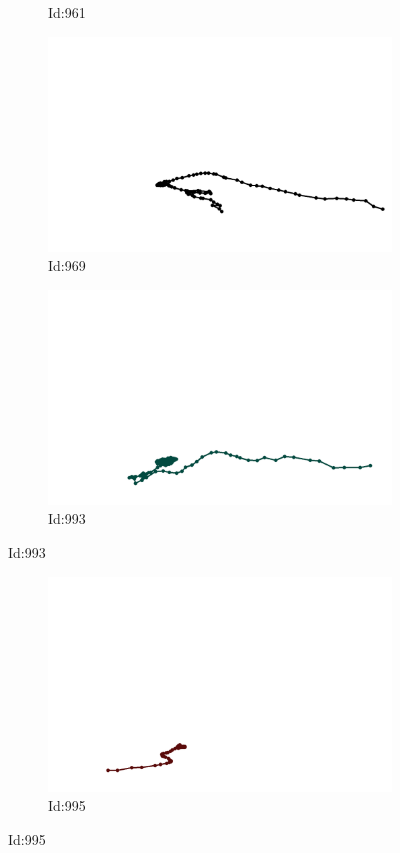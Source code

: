 \documentclass[12pt,twoside]{report}
\begin{document}
\begin{figure}
\begin{subfigure}[b]{0.20\textwidth}
\caption{Id:961}
\end{subfigure}
\begin{subfigure}[b]{0.20\textwidth}
\centering
\includegraphics[width=\textwidth]{../trajectories/969.png}
\caption{Id:969}
\end{subfigure}
\begin{subfigure}[b]{0.20\textwidth}
\centering
\includegraphics[width=\textwidth]{../trajectories/993.png}
\caption{Id:993}
\end{subfigure}
\end{figure}
\begin{figure}
\begin{subfigure}[b]{0.20\textwidth}
\centering
\includegraphics[width=\textwidth]{../trajectories/995.png}
\caption{Id:995}
\end{subfigure}
\end{figure}
\end{document}
